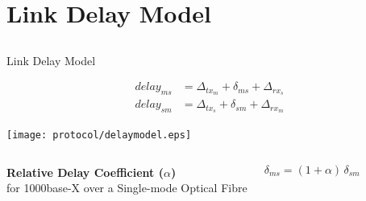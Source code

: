 \documentclass[compress,red]{beamer}
\begin{document}
\section{Link Delay Model}
\subsection{}
\begin{frame}{Link Delay Model}

  \begin{align}
    \nonumber delay_{ms} &= \Delta_{tx_m} + \delta_{ms} + \Delta_{rx_s} \\
    \nonumber delay_{sm} &= \Delta_{tx_s} + \delta_{sm} + \Delta_{rx_m}
  \end{align}

   \vspace{0.2cm}

  \begin{center}
  \texttt{[image: protocol/delaymodel.eps]}
  \end{center}

\begin{columns}[c]
  \column{2.8in}

    \begin{center}
      \textbf{Relative Delay Coefficient ($\alpha$)} \\
      for 1000base-X over a Single-mode Optical Fibre
    \end{center}

  \column{1.5in}
    \begin{center}
      \begin{equation}
      \nonumber \delta_{ms} = (1 + \alpha) \, \delta_{sm}
      \end{equation}
    \end{center}
    \vspace{0.5cm}
\end{columns}
  

\end{frame}
\end{document}
